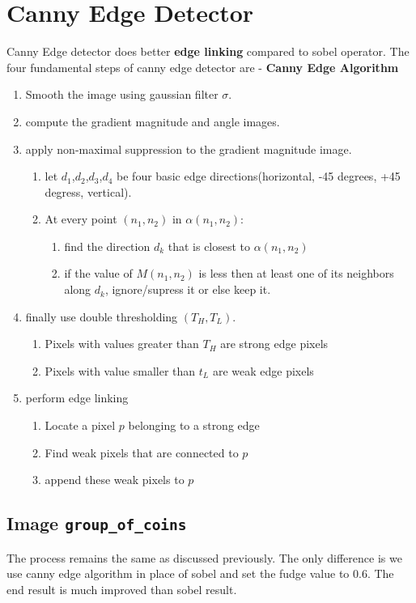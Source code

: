 \section{Canny Edge Detector}
Canny Edge detector does better \textbf{edge linking} compared to sobel operator. The four fundamental steps of canny edge detector are -
\textbf{Canny Edge Algorithm}
\begin{enumerate}
  \item Smooth the image using gaussian filter $\sigma$.
  \item compute the gradient magnitude and angle images.
  \item apply non-maximal suppression to the gradient magnitude image.
    \begin{enumerate}
    \item let $d_1$,$d_2$,$d_3$,$d_4$ be four basic edge directions(horizontal, -45 degrees, +45 degress, vertical).
    \item At every point $(n_1, n_2)$ in $\alpha(n_1, n_2)$:
      \begin{enumerate}
      \item find the direction $d_k$ that is closest to $\alpha(n_1, n_2)$
        \item if the value of $M(n_1, n_2)$ is less then at least one of its neighbors along $d_k$, ignore/supress it or else keep it.
      \end{enumerate}
    \end{enumerate}
  \item finally use double thresholding $(T_H, T_L)$.
    \begin{enumerate}
      \item Pixels with values greater than $T_H$ are strong edge pixels
        \item Pixels with value smaller than $t_L$ are weak edge pixels
    \end{enumerate}
  \item perform edge linking
    \begin{enumerate}
      \item Locate a pixel $p$ belonging to a strong edge
      \item Find weak pixels that are connected to $p$
      \item append these weak pixels to $p$
    \end{enumerate}
\end{enumerate}

\subsection{Image \texttt{group\_of\_coins}}
The process remains the same as discussed previously. The only difference is we use canny edge algorithm in place of sobel and set the fudge value to 0.6. The end result is much improved than sobel result.

